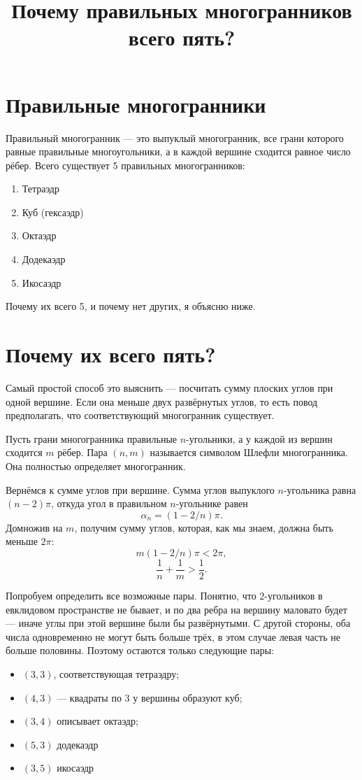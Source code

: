 \documentclass{ncc}
\title{Почему правильных многогранников всего пять?}
\begin{document}
\maketitle
\tableofcontents

\section{Правильные многогранники}

Правильный многогранник --- это выпуклый многогранник, все грани которого равные правильные многоугольники, а в каждой вершине сходится равное число рёбер. Всего существует 5 правильных многогранников:

\begin{enumerate}
  \item Тетраэдр
  \item Куб (гексаэдр)
  \item Октаэдр
  \item Додекаэдр
  \item Икосаэдр
\end{enumerate}


Почему их всего 5, и почему нет других, я объясню ниже.

\section{Почему их всего пять?}

Самый простой способ это выяснить --- посчитать сумму плоских углов при одной вершине. Если она меньше двух развёрнутых углов, то есть повод предполагать, что соответствующий многогранник существует.

Пусть грани многогранника правильные \(n\)-угольники, а у каждой из вершин сходится \(m\) рёбер. Пара \( (n, m)  \) называется символом Шлефли многогранника. Она полностью определяет многогранник.

Вернёмся к сумме углов при вершине. Сумма углов выпуклого \(n\)-угольника равна \( (n-2)\pi \), откуда угол в правильном \(n\)-угольнике равен
\[
    \alpha_n = (1-2/n)\pi.
\]
Домножив на \(m\), получим сумму углов, которая, как мы знаем, должна быть меньше \( 2\pi \):
\[
    m(1-2/n)\pi < 2\pi,
\]
\[
    \frac{1}{n} + \frac{1}{m} > \frac{1}{2}.
\]

Попробуем определить все возможные пары. Понятно, что 2-угольников в евклидовом пространстве не бывает, и по два ребра на вершину маловато будет --- иначе углы при этой вершине были бы развёрнутыми. С другой стороны, оба числа одновременно не могут быть больше трёх, в этом случае левая часть не больше половины. Поэтому остаются только следующие пары:
\begin{itemize}
  \item \( (3,3) \), соответствующая тетраэдру;
  \item \( (4,3) \) --- квадраты по 3 у вершины образуют куб;
  \item \( (3,4) \) описывает октаэдр;
  \item \( (5,3) \) додекаэдр
  \item \( (3,5) \) икосаэдр
\end{itemize}
\end{document}
